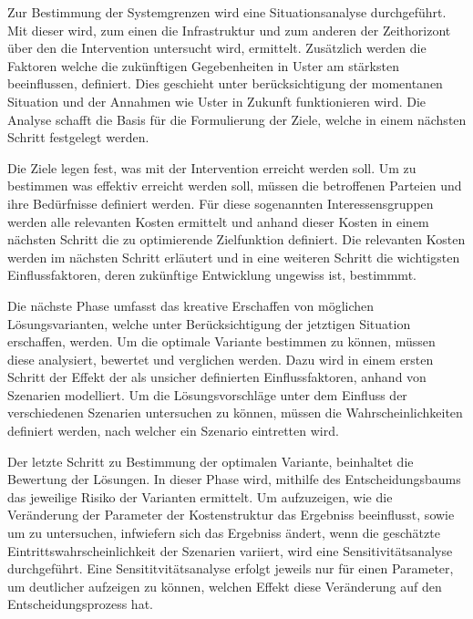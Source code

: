 \begin{IMleftrightskip}
Zur Bestimmung der Systemgrenzen wird eine Situationsanalyse durchgeführt. Mit dieser wird, zum einen die Infrastruktur und zum anderen der Zeithorizont über den die Intervention untersucht wird, ermittelt. Zusätzlich werden die Faktoren welche die zukünftigen Gegebenheiten in Uster am stärksten beeinflussen, definiert. Dies geschieht unter berücksichtigung der momentanen Situation und der Annahmen wie Uster in Zukunft funktionieren wird. Die Analyse schafft die Basis für die Formulierung der Ziele, welche in einem nächsten Schritt festgelegt werden.

Die Ziele legen fest, was mit der Intervention erreicht werden soll. Um zu bestimmen was effektiv erreicht werden soll, müssen die betroffenen Parteien und ihre Bedürfnisse definiert werden. Für diese sogenannten Interessensgruppen werden alle relevanten Kosten ermittelt und anhand dieser Kosten in einem nächsten Schritt die zu optimierende Zielfunktion definiert. Die relevanten Kosten werden im nächsten Schritt erläutert und in eine weiteren Schritt die wichtigsten Einflussfaktoren, deren zukünftige Entwicklung ungewiss ist, bestimmmt. 

Die nächste Phase umfasst das kreative Erschaffen von möglichen Lösungsvarianten, welche unter Berücksichtigung der jetztigen Situation erschaffen, werden. Um die optimale Variante bestimmen zu können, müssen diese analysiert, bewertet und verglichen werden. Dazu wird in einem ersten Schritt der Effekt der als unsicher definierten Einflussfaktoren, anhand von Szenarien modelliert. Um die Lösungsvorschläge unter dem Einfluss der verschiedenen Szenarien untersuchen zu können, müssen die Wahrscheinlichkeiten definiert werden, nach welcher ein Szenario eintretten wird. 

Der letzte Schritt zu Bestimmung der optimalen Variante, beinhaltet die Bewertung der Lösungen. In dieser Phase wird, mithilfe des Entscheidungsbaums das jeweilige Risiko der Varianten ermittelt. Um aufzuzeigen, wie die Veränderung der Parameter der Kostenstruktur das Ergebniss beeinflusst, sowie um zu untersuchen, infwiefern sich das Ergebniss ändert, wenn die geschätzte Eintrittswahrscheinlichkeit der Szenarien variiert, wird eine Sensitivitätsanalyse durchgeführt. Eine Sensititvitätsanalyse erfolgt jeweils nur für einen Parameter, um deutlicher aufzeigen zu können, welchen Effekt diese Veränderung auf den Entscheidungsprozess hat. 
\end{IMleftrightskip}

